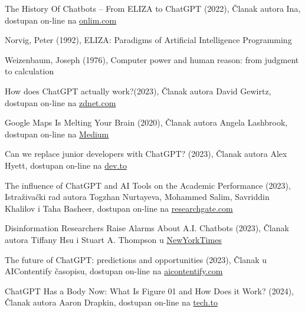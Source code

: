 \documentclass[fleqn, 12pt]{article}
\begin{document}
{
\raggedright
\renewcommand{\refname}{Reference}
\begin{thebibliography}{9}
     The History Of Chatbots – From ELIZA to ChatGPT (2022), Članak autora Ina, dostupan on-line na \href{https://onlim.com/en/the-history-of-chatbots/}{onlim.com}
    
     Norvig, Peter (1992), ELIZA: Paradigms of Artificial Intelligence Programming
    
     Weizenbaum, Joseph (1976), Computer power and human reason: from judgment to calculation
    
     How does ChatGPT actually work?(2023), Članak autora David Gewirtz, dostupan on-line na \href{https://www.zdnet.com/article/how-does-chatgpt-work/}{zdnet.com}
    
     Google Maps Is Melting Your Brain (2020), Članak autora Angela Lashbrook, dostupan on-line na \href{https://debugger.medium.com/google-maps-is-melting-your-brain-a9b34adc0936}{Medium}
    
     Can we replace junior developers with ChatGPT? (2023), Članak autora Alex Hyett, dostupan on-line na  \href{https://dev.to/alexhyettdev/can-we-replace-junior-developers-with-chatgpt-343h }{dev.to}
    
     The influence of ChatGPT and AI Tools on the Academic Performance (2023), Istraživački rad autora Togzhan Nurtayeva, Mohammed Salim, Savriddin Khalilov i Taha Basheer, dostupan on-line na \href{https://www.researchgate.net/publication/371405528_The_influence_of_ChatGPT_and_AI_Tools_on_the_Academic_Performance}{researchgate.com}
        
     Disinformation Researchers Raise Alarms About A.I. Chatbots (2023), Članak autora Tiffany Hsu i Stuart A. Thompson u \href{https://www.nytimes.com/2023/02/08/technology/ai-chatbots-disinformation.html}{NewYorkTimes}
        
     The future of ChatGPT: predictions and opportunities (2023), Članak u AIContentify časopisu, dostupan on-line na \href{https://aicontentfy.com/en/blog/future-of-chatgpt-predictions-and-opportunities}{aicontentify.com}
    
     ChatGPT Has a Body Now: What Is Figure 01 and How Does it Work? (2024), Članak autora Aaron Drapkin, dostupan on-line na \href{https://tech.co/news/what-is-figure-01-chatgpt}{tech.to}
\end{thebibliography}
}
\end{document}

